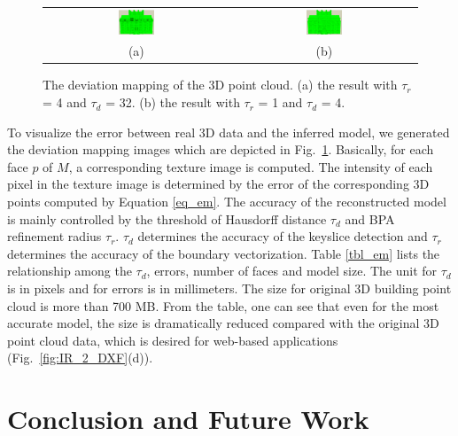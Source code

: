\documentclass{acmsiggraph}                     %
\newcommand{\Fig}[1]{Fig.~\ref{fig:#1}}
\newcommand{\Figd}[1]{Fig.~\ref{fig:#1}(d)}
\begin{document}
\begin{figure} [htbp]
\begin{center}
\begin{tabular}{cc}
\includegraphics[width=0.2\textwidth]{IR_skp_error_face_1000_32_4_paper.png} &
\includegraphics[width=0.2\textwidth]{IR_skp_error_face_1000_4_1_paper.png} \\
(a) & (b)
\end{tabular}
\end{center}
\caption{The deviation mapping of the 3D point cloud. (a) the result with $\tau_r$ = 4 and $\tau_d$ = 32.
(b) the result with $\tau_r$ = 1 and $\tau_d$ = 4. }
\label{fig:EM}
\end{figure}

To visualize the error between real 3D data and the inferred model,
we generated the deviation mapping images which are depicted in \Fig{EM}.
Basically, for each face $p$ of $M$, a corresponding texture image is computed.
The intensity of each pixel in the texture image
is determined by the error of the corresponding 3D points computed by Equation \ref{eq_em}.
The accuracy of the reconstructed model is mainly controlled by the threshold of Hausdorff distance $\tau_d$
and BPA refinement radius $\tau_r$. $\tau_d$ determines the accuracy of the keyslice detection
and $\tau_r$ determines the accuracy of the boundary vectorization.
Table \ref{tbl_em} lists the relationship among the $\tau_d$, errors, number of faces and model size.
The unit for $\tau_d$ is in pixels and for errors is in millimeters.
The size for original 3D building point cloud is more than 700 MB. From the table, one can see that even
for the most accurate model, the size is dramatically reduced compared with the original 3D point cloud data,
which is desired for web-based applications (\Figd{IR_2_DXF}).

\section{Conclusion and Future Work}
\end{document}
